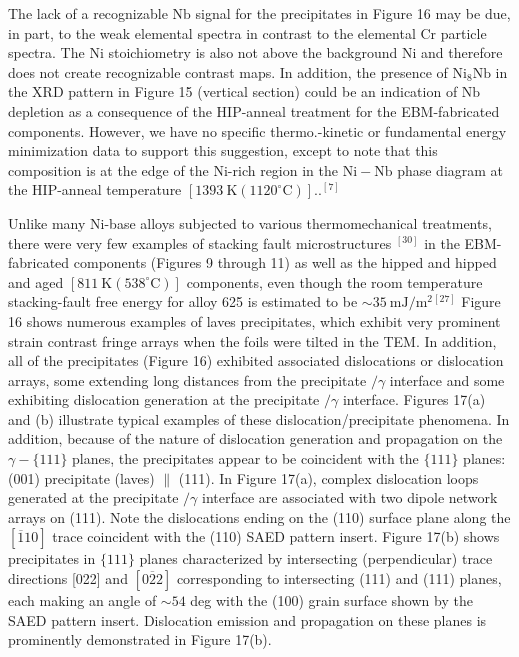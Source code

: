 \documentclass[10pt]{article}
\begin{document}
The lack of a recognizable $\mathrm{Nb}$ signal for the precipitates in Figure 16 may be due, in part, to the weak elemental spectra in contrast to the elemental $\mathrm{Cr}$ particle spectra. The Ni stoichiometry is also not above the background $\mathrm{Ni}$ and therefore does not create recognizable contrast maps. In addition, the presence of $\mathrm{Ni}_{8} \mathrm{Nb}$ in the XRD pattern in Figure 15 (vertical section) could be an indication of $\mathrm{Nb}$ depletion as a consequence of the HIP-anneal treatment for the EBM-fabricated components. However, we have no specific thermo.-kinetic or fundamental energy minimization data to support this suggestion, except to note that this composition is at the edge of the Ni-rich region in the $\mathrm{Ni}-\mathrm{Nb}$ phase diagram at the HIP-anneal temperature $\left[1393 \mathrm{~K}\left(1120^{\circ} \mathrm{C}\right)\right] . .^{[7]}$

Unlike many Ni-base alloys subjected to various thermomechanical treatments, there were very few examples of stacking fault microstructures ${ }^{[30]}$ in the EBM-fabricated components (Figures 9 through 11) as well as the hipped and hipped and aged $\left[811 \mathrm{~K}\left(538^{\circ} \mathrm{C}\right)\right]$ components, even though the room temperature stacking-fault free energy for alloy 625 is estimated to be $\sim 35 \mathrm{~mJ} / \mathrm{m}^{2}{ }^{[27]}$ Figure 16 shows numerous examples of laves precipitates, which exhibit very prominent strain contrast fringe arrays when the foils were tilted in the TEM. In addition, all of the precipitates (Figure 16) exhibited associated dislocations or dislocation arrays, some extending long distances from the precipitate $/ \gamma$ interface and some exhibiting dislocation generation at the precipitate $/ \gamma$ interface. Figures 17(a) and (b) illustrate typical examples of these dislocation/precipitate phenomena. In addition, because of the nature of dislocation generation and propagation on the $\gamma-\{111\}$ planes, the precipitates appear to be coincident with the $\{111\}$ planes: (001) precipitate (laves) $\|$ (111). In Figure 17(a), complex dislocation loops generated at the precipitate $/ \gamma$ interface are associated with two dipole network arrays on (111). Note the dislocations ending on the (110) surface plane along the $[\overline{1} 10]$ trace coincident with the (110) SAED pattern insert. Figure 17(b) shows precipitates in $\{111\}$ planes characterized by intersecting (perpendicular) trace directions [022] and $[0 \overline{2} 2]$ corresponding to intersecting (111) and (111) planes, each making an angle of $\sim 54$ deg with the (100) grain surface shown by the SAED pattern insert. Dislocation emission and propagation on these planes is prominently demonstrated in Figure 17(b).
\end{document}
